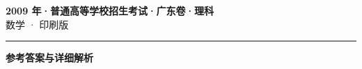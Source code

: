 \documentclass[zihao=5, a4paper]{ctexart}
\begin{document}
\begin{center}
  {\Large\bfseries 2009 年·普通高等学校招生考试·广东卷·理科}\\[4pt]
  {\large 数学 · 印刷版}
\end{center}
\medskip
{}

\par\bigskip\hrule\bigskip
{}
\begin{center}{\large\bfseries 参考答案与详细解析}\end{center}
\smallskip

\end{document}
